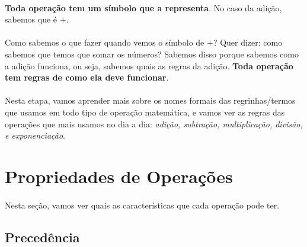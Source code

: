 \documentclass{article}
\begin{document}
\paragraph{}
\textbf{Toda operação tem um símbolo que a representa}. 
No caso da adição, sabemos que é $+$.
\paragraph{}
Como sabemos o que fazer quando vemos o símbolo de $+$? Quer dizer: como 
sabemos que temos que somar os números? Sabemos disso porque sabemos como a
adição funciona, ou seja, sabemos quais as regras da adição. 
\textbf{Toda operação tem regras de como ela deve funcionar}.
\paragraph{}
Nesta etapa, vamos aprender mais sobre os nomes formais das regrinhas/termos que 
usamos em todo tipo de operação matemática, e vamos ver as regras das operações
que mais usamos no dia a dia: \textit{adição, subtração, multiplicação, divisão,
e exponenciação}.

\section{Propriedades de Operações}
\paragraph{}
Nesta seção, vamos ver quais as características que cada operação pode ter.

\subsection{Precedência}
\end{document}
